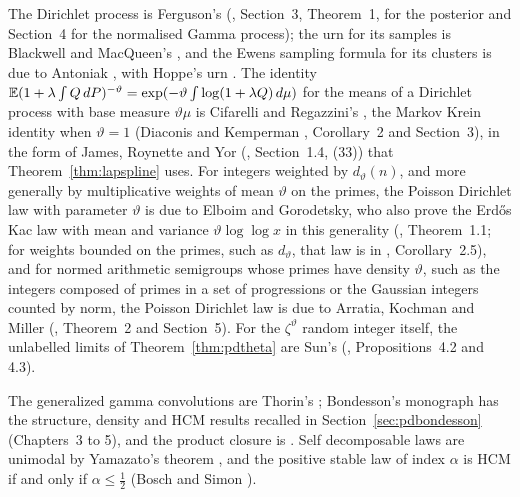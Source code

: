 The Dirichlet process is Ferguson's (\cite{ferguson1973}, Section~3, Theorem~1, for the posterior and Section~4 for the normalised Gamma process); the urn for its samples is Blackwell and MacQueen's \cite{blackwellmacqueen1973}, and the Ewens sampling formula \cite{ewens1972} for its clusters is due to Antoniak \cite{antoniak1974}, with Hoppe's urn \cite{hoppe1984}. The identity $\mathbb{E}(1+\lambda\int Q\,dP)^{-\vartheta}=\exp(-\vartheta\int\log(1+\lambda Q)\,d\mu)$ for the means of a Dirichlet process with base measure $\vartheta\mu$ is Cifarelli and Regazzini's \cite{cifarelliregazzini1990}, the Markov Krein identity when $\vartheta=1$ (Diaconis and Kemperman \cite{diaconiskemperman1996}, Corollary~2 and Section~3), in the form of James, Roynette and Yor (\cite{jamesroynetteyor2008}, Section~1.4, (33)) that Theorem~\ref{thm:lapspline} uses. For integers weighted by $d_\vartheta(n)$, and more generally by multiplicative weights of mean $\vartheta$ on the primes, the Poisson Dirichlet law with parameter $\vartheta$ is due to Elboim and Gorodetsky, who also prove the Erd\H{o}s Kac law with mean and variance $\vartheta\log\log x$ in this generality (\cite{elboimgorodetsky2024}, Theorem~1.1; for weights bounded on the primes, such as $d_\vartheta$, that law is in \cite{tenenbaum2017}, Corollary~2.5), and for normed arithmetic semigroups whose primes have density $\vartheta$, such as the integers composed of primes in a set of progressions or the Gaussian integers counted by norm, the Poisson Dirichlet law is due to Arratia, Kochman and Miller (\cite{arratiakochmanmiller2014}, Theorem~2 and Section~5). For the $\zeta^\vartheta$ random integer itself, the unlabelled limits of Theorem~\ref{thm:pdtheta} are Sun's (\cite{sun2026}, Propositions~4.2 and 4.3).

The generalized gamma convolutions are Thorin's \cite{thorin1977,thorin1977b}; Bondesson's monograph \cite{bondesson1992} has the structure, density and HCM results recalled in Section~\ref{sec:pdbondesson} (Chapters~3 to 5), and the product closure is \cite{bondesson2015}. Self decomposable laws are unimodal by Yamazato's theorem \cite{yamazato1978}, and the positive stable law of index $\alpha$ is HCM if and only if $\alpha\le\frac12$ (Bosch and Simon \cite{boschsimon2016}).

